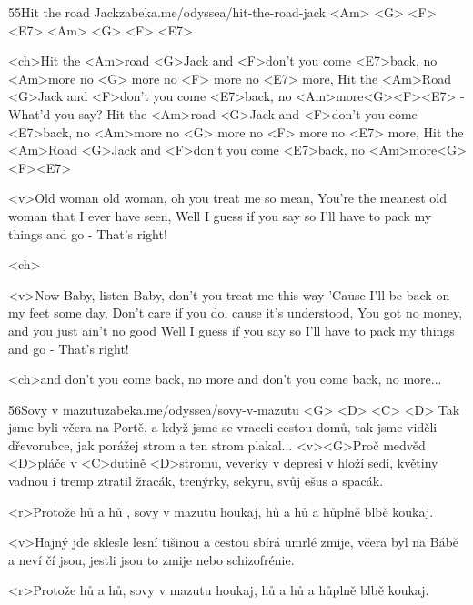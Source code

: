 \begin{song}{55}{Hit the road Jack}{zabeka.me/odyssea/hit-the-road-jack}
	<Am> <G> <F> <E7> <Am> <G> <F> <E7>

	<ch>Hit the <Am>road <G>Jack and <F>don't you come <E7>back,
	no <Am>more no <G> more no <F> more no <E7> more,
	Hit the <Am>Road <G>Jack and <F>don't you come <E7>back,
	no <Am>more<G><F><E7> - What'd you say?
	Hit the <Am>road <G>Jack and <F>don't you come <E7>back,
	no <Am>more no <G> more no <F> more no <E7> more,
	Hit the <Am>Road <G>Jack and <F>don't you come <E7>back,
	no <Am>more<G><F><E7>

	<v>Old woman old woman, oh you treat me so mean,
	You're the meanest old woman that I ever have seen,
	Well I guess if you say so
	I'll have to pack my things and go - That's right!

	<ch>

	<v>Now Baby, listen Baby, don't you treat me this way
	'Cause I'll be back on my feet some day,
	Don't care if you do, cause it's understood,
	You got no money, and you just ain't no good
	Well I guess if you say so
	I'll have to pack my things and go - That's right!

	<ch>and don't you come back, no more
	and don't you come back, no more...
\end{song}
\begin{song}{56}{Sovy v mazutu}{zabeka.me/odyssea/sovy-v-mazutu}
	<G> <D> <C> <D>
	Tak jsme byli včera na Portě, a když jsme se vraceli cestou domů,
	tak jsme viděli dřevorubce, jak porážej strom a ten strom plakal...
	<v><G>Proč medvěd <D>pláče v <C>dutině <D>stromu, veverky v depresi v hloží sedí,
	květiny vadnou i tremp ztratil žracák, trenýrky, sekyru, svůj ešus a spacák.

	<r>Protože hů a hů , sovy v mazutu houkaj,
	hů a hů a hůplně blbě koukaj.

	<v>Hajný jde sklesle lesní tišinou a cestou sbírá umrlé zmije,
	včera byl na Bábě a neví čí jsou, jestli jsou to zmije nebo schizofrénie.

	<r>Protože hů a hů, sovy v mazutu houkaj,
	hů a hů a hůplně blbě koukaj.
\end{song}
